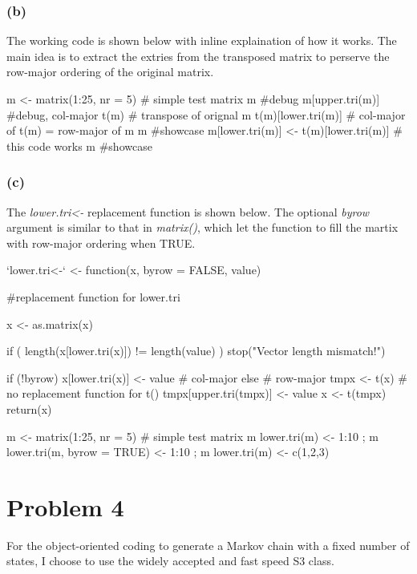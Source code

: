 \documentclass{article}
\begin{document}
\subsubsection*{(b)}
The working code is shown below with inline explaination of how it works. The main idea is to extract the 
extries from the transposed matrix to perserve the row-major ordering of the original matrix.

m <- matrix(1:25, nr = 5) # simple test matrix
m #debug
m[upper.tri(m)] #debug, col-major
t(m) # transpose of orignal m
t(m)[lower.tri(m)] # col-major of t(m) = row-major of m
m #showcase
m[lower.tri(m)] <- t(m)[lower.tri(m)] # this code works
m #showcase

\subsubsection*{(c)}
The \textit{lower.tri<-} replacement function is shown below. The optional \textit{byrow} argument is 
similar to that in \textit{matrix()}, which let the function to fill the martix with row-major ordering when TRUE.

`lower.tri<-` <- function(x, byrow = FALSE, value){ 
    #replacement function for lower.tri
    
    x <- as.matrix(x)
    
    if ( length(x[lower.tri(x)]) != length(value) ) 
      stop("Vector length mismatch!")
	
    if (!byrow)	x[lower.tri(x)] <- value # col-major
    else { # row-major
        tmpx <- t(x) # no replacement function for t()
        tmpx[upper.tri(tmpx)] <- value
        x <- t(tmpx)
    }
    return(x)
}

m <- matrix(1:25, nr = 5) # simple test matrix
m
lower.tri(m) <- 1:10 ; 	m
lower.tri(m, byrow = TRUE) <- 1:10 ; m
lower.tri(m) <- c(1,2,3)


\newpage
\section*{Problem 4}
For the object-oriented coding to generate a Markov chain with a fixed number of states, I choose to use the 
widely accepted and fast speed S3 class.
\end{document}
